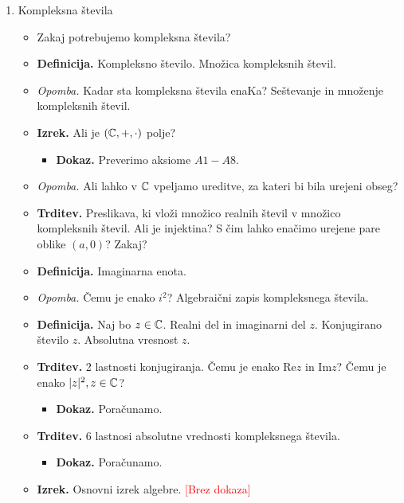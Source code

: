 \begin{enumerate}
    \newpage
    \item Kompleksna števila
    \begin{itemize}
        \item Zakaj potrebujemo kompleksna števila?
        \item \colorbox{purple!30}{\textbf{Definicija.}} Kompleksno število. Množica kompleksnih števil.
        \item \colorbox{yellow!30}{\emph{Opomba.}} Kadar sta kompleksna števila enaKa? Seštevanje in množenje kompleksnih števil.
        \item \colorbox{blue!30}{\textbf{Izrek.}} Ali je $(\mathbb{C}, +, \cdot)$ polje?
        \begin{itemize}
            \item \colorbox{green!30}{\textbf{Dokaz.}} Preverimo aksiome $A1-A8$.
        \end{itemize}
        \item \colorbox{yellow!30}{\emph{Opomba.}} Ali lahko v $\mathbb{C}$ vpeljamo ureditve, za kateri bi bila urejeni obseg?
        \item \colorbox{blue!30}{\textbf{Trditev.}} Preslikava, ki vloži množico realnih števil v množico kompleksnih števil. Ali je injektina? S čim lahko enačimo urejene pare oblike $(a, 0)$? Zakaj?
        \item \colorbox{purple!30}{\textbf{Definicija.}} Imaginarna enota.
        \item \colorbox{yellow!30}{\emph{Opomba.}} Čemu je enako $i^2$? Algebraični zapis kompleksnega števila.
        \item \colorbox{purple!30}{\textbf{Definicija.}} Naj bo $z \in \mathbb{C}$. Realni del in imaginarni del $z$. Konjugirano število $z$. Absolutna vresnost $z$.
        \item \colorbox{blue!30}{\textbf{Trditev.}} 2 lastnosti konjugiranja. Čemu je enako $\text{Re} z$ in $\text{Im} z$? Čemu je enako $|z|^2, z \in \mathbb{C}$?
        \begin{itemize}
            \item \colorbox{green!30}{\textbf{Dokaz.}} Poračunamo.
        \end{itemize}
        \item \colorbox{blue!30}{\textbf{Trditev.}} 6 lastnosi absolutne vrednosti kompleksnega števila. 
        \begin{itemize}
            \item \colorbox{green!30}{\textbf{Dokaz.}} Poračunamo.
        \end{itemize}
        \item \colorbox{blue!30}{\textbf{Izrek.}} Osnovni izrek algebre. \textcolor{red}{[Brez dokaza]}
    \end{itemize}


\end{enumerate}
